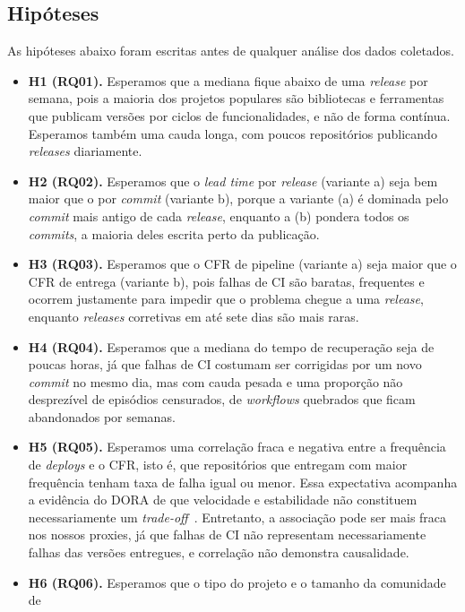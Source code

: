 \subsection{Hipóteses}
\label{sec:hipoteses}

As hipóteses abaixo foram escritas antes de qualquer análise dos dados coletados.

\begin{itemize}
  \item \textbf{H1 (RQ01).} Esperamos que a mediana fique abaixo de uma \textit{release} por
  semana, pois a maioria dos projetos populares são bibliotecas e ferramentas que publicam versões
  por ciclos de funcionalidades, e não de forma contínua. Esperamos também uma cauda longa, com
  poucos repositórios publicando \textit{releases} diariamente.
  \item \textbf{H2 (RQ02).} Esperamos que o \textit{lead time} por \textit{release} (variante a)
  seja bem maior que o por \textit{commit} (variante b), porque a variante (a) é dominada pelo
  \textit{commit} mais antigo de cada \textit{release}, enquanto a (b) pondera todos os
  \textit{commits}, a maioria deles escrita perto da publicação.
  \item \textbf{H3 (RQ03).} Esperamos que o CFR de pipeline (variante a) seja maior que o CFR de
  entrega (variante b), pois falhas de CI são baratas, frequentes e ocorrem justamente para
  impedir que o problema chegue a uma \textit{release}, enquanto \textit{releases} corretivas em
  até sete dias são mais raras.
  \item \textbf{H4 (RQ04).} Esperamos que a mediana do tempo de recuperação seja de poucas horas,
  já que falhas de CI costumam ser corrigidas por um novo \textit{commit} no mesmo dia, mas com
  cauda pesada e uma proporção não desprezível de episódios censurados, de \textit{workflows}
  quebrados que ficam abandonados por semanas.
  \item \textbf{H5 (RQ05).} Esperamos uma correlação fraca e negativa entre a frequência de
  \textit{deploys} e o CFR, isto é, que repositórios que entregam com maior frequência tenham
  taxa de falha igual ou menor. Essa expectativa acompanha a evidência do DORA de que velocidade
  e estabilidade não constituem necessariamente um \textit{trade-off}~\cite{doraMetricas}.
  Entretanto, a associação pode ser mais fraca nos nossos proxies, já que falhas de CI não
  representam necessariamente falhas das versões entregues, e correlação não demonstra causalidade.
  \item \textbf{H6 (RQ06).} Esperamos que o tipo do projeto e o tamanho da comunidade de

\end{itemize}
